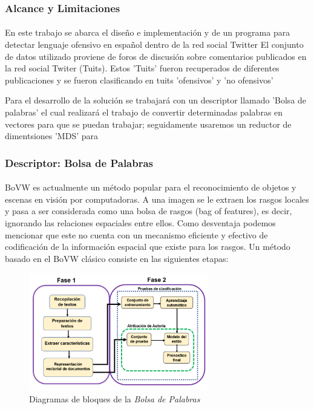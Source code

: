 \documentclass{article}
\begin{document}
\subsubsection{Alcance y Limitaciones}
\paragraph{}
En este trabajo se abarca el diseño e implementación y de un programa para detectar lenguaje ofensivo en español dentro de la red social Twitter
El conjunto de datos utilizado proviene de foros de discusión sobre comentarios publicados en la red social Twiter (Tuits). Estos 'Tuits' fueron recuperados de diferentes publicaciones y se fueron clasificando en tuits 'ofensivos' y 'no ofensivos'

Para el desarrollo de la solución se trabajará con un descriptor llamado 'Bolsa de palabras' el cual realizará el trabajo de convertir determinadas palabras en vectores para que se puedan trabajar; seguidamente usaremos un reductor de dimentsiones 'MDS' para 
\subsubsection{Descriptor: Bolsa de Palabras}
\paragraph{}
BoVW es actualmente un método popular para el reconocimiento de objetos y escenas en visión por computadoras. A una imagen se le extraen los rasgos locales y pasa a ser considerada como una bolsa de rasgos (bag of features), es decir, ignorando las relaciones espaciales entre ellos. Como desventaja podemos mencionar que este no cuenta con un mecanismo eficiente y efectivo de codificación de la información espacial que existe para los rasgos. Un método basado en el BoVW clásico consiste en las siguientes etapas:

\begin{figure}[h!]
	\centering
	\includegraphics[width=0.7\textwidth]{img/diagrama_bloques.png}
	\caption{Diagramas de bloques de la \textit{Bolsa de Palabras}}
	\label{fig:diagrama_bloques}
\end{figure}
\end{document}
